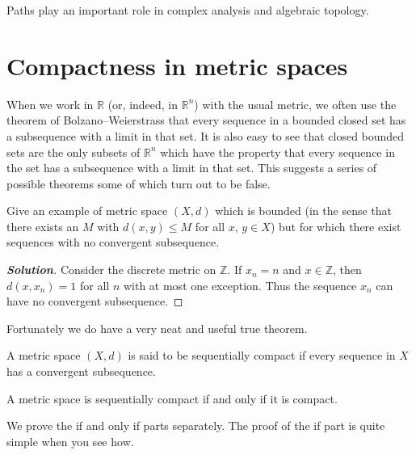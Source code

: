 Paths play an important role in complex analysis and algebraic topology.













\section{Compactness in metric spaces} When we work in ${\mathbb R}$
(or, indeed, in ${\mathbb R}^{n}$) with the usual metric, 
we often use the theorem of Bolzano--Weierstrass that every
sequence in a bounded closed set has a subsequence with a limit
in that set. It is also easy to see that closed bounded
sets are the only subsets of ${\mathbb R}^{n}$ which have the
property that every sequence in the set 
has a subsequence with a limit in that set. This suggests
a series of possible theorems some of which turn out to be false.



\begin{theorem}\label{T;bounded not convergent}
Give an example of metric space $(X,d)$ which is bounded (in the sense that there exists an $M$
with $d(x,y)\leq M$ for all $x,\,y\in X$) but 
for which there exist sequences with no convergent subsequence.
\end{theorem}
\begin{proof}[\bf Solution] Consider the discrete metric on 
${\mathbb Z}$. If $x_{n}=n$ and $x\in {\mathbb Z}$,
then $d(x,x_{n})=1$ for all $n$
with at most one exception. Thus the sequence $x_{n}$ 
can have no convergent subsequence.
\end{proof}


Fortunately we do have a very neat and useful true theorem.
\begin{definition}\label{D;sequential compactness}
A metric space $(X,d)$ is said to be
sequentially compact if every sequence in $X$ has a 
convergent subsequence.
\end{definition}

\begin{theorem}\label{T;sequence same}
A metric space is sequentially compact if and only if it
is compact.
\end{theorem}

We prove the if and only if parts separately.
The proof of the if part is quite simple when you see how.



